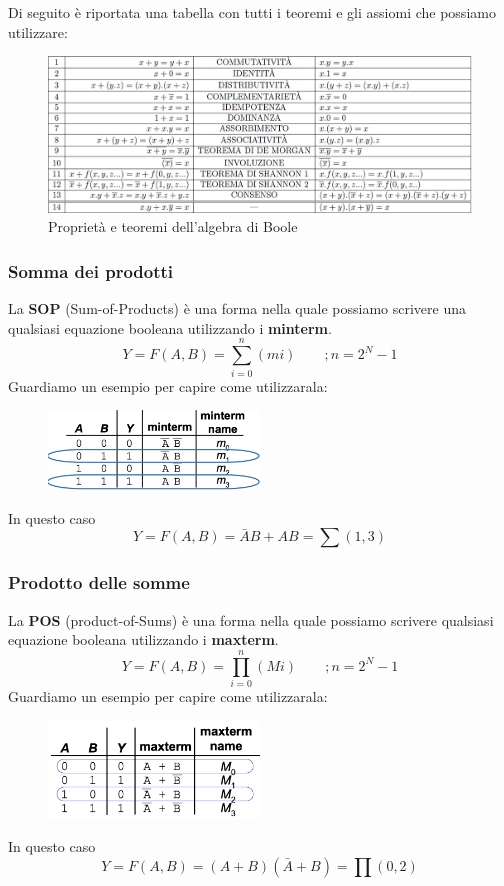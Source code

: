 \documentclass[../main.tex]{subfiles}
\begin{document}
Di seguito è riportata una tabella con tutti i teoremi e gli assiomi che possiamo utilizzare:
\begin{figure}[h]
    \centering
    \includegraphics[width=1\textwidth]{images/teoremiAlgebraBool.png}
    \caption{Proprietà e teoremi dell'algebra di Boole}
\end{figure}

\pagebreak
\subsubsection{Somma dei prodotti}
La \textbf{SOP} (Sum-of-Products) è una forma nella quale possiamo scrivere una qualsiasi equazione booleana utilizzando i \textbf{minterm}.
$$
    Y = F(A,B) = \sum_{i = 0}^{n}(mi)\phantom{--};n=2^N -1 
$$
Guardiamo un esempio per capire come utilizzarala:
\begin{figure}[h]
    \centering
    \includegraphics[width=0.5\textwidth]{images/sop.png}
\end{figure}

In questo caso
$$
    Y = F(A,B) = \bar{A}B + AB = \sum(1,3)
$$

\subsubsection{Prodotto delle somme}
La \textbf{POS} (product-of-Sums) è una forma nella quale possiamo scrivere qualsiasi equazione booleana utilizzando i \textbf{maxterm}.
$$
    Y = F(A,B) = \prod_{i = 0}^{n}(Mi)\phantom{--};n=2^N  -1
$$
Guardiamo un esempio per capire come utilizzarala:
\begin{figure}[h]
    \centering
    \includegraphics[width=0.5\textwidth]{images/pos.png}
\end{figure}

In questo caso
$$
    Y = F(A,B) = (A+B)(\bar{A}+B) = \prod(0,2)
$$
\end{document}
